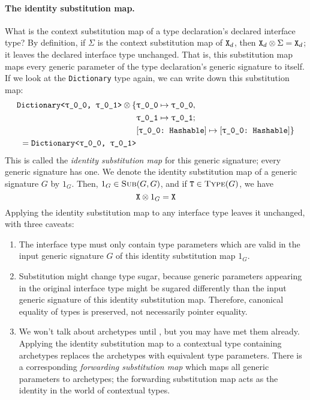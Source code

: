 \documentclass[../generics]{subfiles}
\begin{document}
\paragraph{The identity substitution map.}
What is the context substitution map of a type declaration's declared interface type? By definition, if $\Sigma$ is the context substitution map of $\texttt{X}_d$, then $\texttt{X}_d\otimes\Sigma=\texttt{X}_d$; it leaves the declared interface type unchanged. That is, this substitution map maps every generic parameter of the type declaration's generic signature to itself. If we look at the \texttt{Dictionary} type again, we can write down this substitution map:
\begin{align*}
\texttt{Dictionary<\ttgp{0}{0}, \ttgp{0}{1}>}\otimes
\SubstMapC{
&\SubstType{\ttgp{0}{0}}{\ttgp{0}{0}},\\
&\SubstType{\ttgp{0}{1}}{\ttgp{0}{1}}
}{\\
&\SubstConf{\ttgp{0}{0}}{\ttgp{0}{0}}{Hashable}
}\\
{} = \texttt{Dictionary<\ttgp{0}{0}, \ttgp{0}{1}>}
\end{align*}
This is called the \emph{identity substitution map} for this generic signature; every generic signature has one. We denote the identity substitution map of a generic signature $G$ by $1_G$. Then, $1_G\in\textsc{Sub}({G, G})$, and if $\texttt{T}\in\textsc{Type}({G})$, we have
\[\texttt{X} \otimes 1_G = \texttt{X}\]
Applying the identity substitution map to any interface type leaves it unchanged, with three caveats:
\begin{enumerate}
\item The interface type must only contain type parameters which are valid in the input generic signature $G$ of this identity substitution map $1_G$.
\item Substitution might change type sugar, because generic parameters appearing in the original interface type might be sugared differently than the input generic signature of this identity substitution map. Therefore, canonical equality of types is preserved, not necessarily pointer equality.
\item We won't talk about archetypes until , but you may have met them already. Applying the identity substitution map to a contextual type containing archetypes replaces the archetypes with equivalent type parameters. There is a corresponding \emph{forwarding substitution map} which maps all generic parameters to archetypes; the forwarding substitution map acts as the identity in the world of contextual types.
\end{enumerate}
\end{document}
